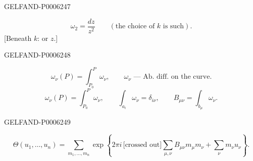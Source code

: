 \begin{GelfandAdjacentEvidence}{GELFAND-P000624}{7}

\[
\omega_2=\frac{dz}{z^2}\qquad(\text{the choice of \(k\) is such}).
\]
[Beneath \(k\): or \(z\).]
\end{GelfandAdjacentEvidence}
\begin{GelfandAdjacentEvidence}{GELFAND-P000624}{8}

\[
\omega_\nu(P)=\int_{P_0}^{P}\omega_\nu,\qquad
\omega_\nu\text{ --- Ab. diff. on the curve}.
\]
\[
\omega_\nu(P)=\int_{P_0}^{P}\omega_\nu,\qquad
\int_{a_i}\omega_\nu=\delta_{i\nu},\qquad
B_{\mu\nu}=\int_{b_\mu}\omega_\nu.
\]
\end{GelfandAdjacentEvidence}
\begin{GelfandAdjacentEvidence}{GELFAND-P000624}{9}

\[
\Theta(u_1,\ldots,u_n)=\sum_{m_1,\ldots,m_n}
\exp\left\{2\pi i\,\text{[crossed out]}\!
\sum_{\mu,\nu} B_{\mu\nu}m_\mu m_\nu+\sum_\nu m_\nu u_\nu\right\}.
\]
\end{GelfandAdjacentEvidence}

\begin{center}\textemdash\,\textperiodcentered\,\textemdash\end{center}


